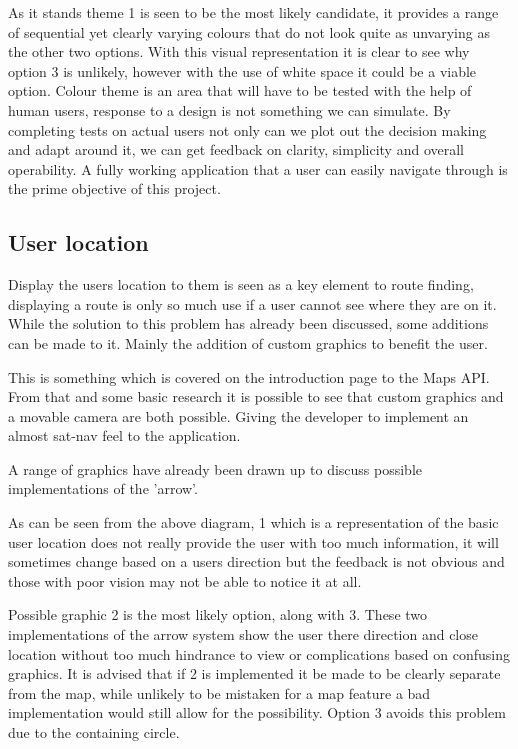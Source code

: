 As it stands theme 1 is seen to be the most likely candidate, it provides a range of sequential yet clearly varying colours that do not look quite as unvarying as the other two options. With this visual representation it is clear to see why option 3 is unlikely, however with the use of white space it could be a viable option. Colour theme is an area that will have to be tested with the help of human users, response to a design is not something we can simulate. By completing tests on actual users not only can we plot out the decision making and adapt around it, we can get feedback on clarity, simplicity and overall operability. A fully working application that a user can easily navigate through is the prime objective of this project. 
\subsection{User location}
Display the users location to them is seen as a key element to route finding, displaying a route is only so much use if a user cannot see where they are on it. While the solution to this problem has already been discussed, some additions can be made to it. Mainly the addition of custom graphics to benefit the user. 

This is something which is covered on the introduction page to the Maps API. From that and some basic research it is possible to see that custom graphics and a movable camera are both possible. Giving the developer to implement an almost sat-nav feel to the application. 

A range of graphics have already been drawn up to discuss possible implementations of the 'arrow'.

As can be seen from the above diagram, 1 which is a representation of the basic user location does not really provide the user with too much information, it will sometimes change based on a users direction but the feedback is not obvious and those with poor vision may not be able to notice it at all. 

Possible graphic 2 is the most likely option, along with 3. These two implementations of the arrow system show the user there direction and close location without too much hindrance to view or complications based on confusing graphics. It is advised that if 2 is implemented it be made to be clearly separate from the map, while unlikely to be mistaken for a map feature a bad implementation would still allow for the possibility. Option 3 avoids this problem due to the containing circle.

